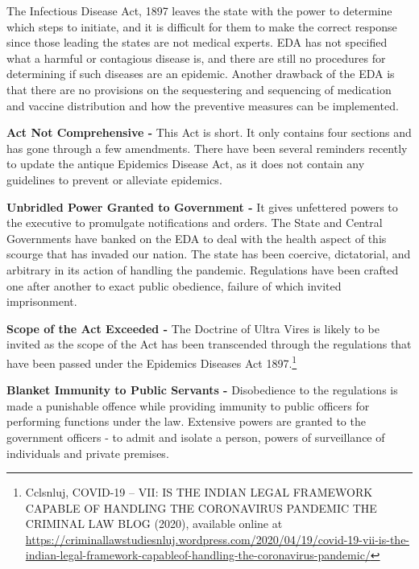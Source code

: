 \begin{multicols}{2}
\noi
The Infectious Disease Act, 1897 leaves the state with the power to determine which steps to
initiate, and it is difficult for them to make the correct response since those leading the states
are not medical experts. EDA has not specified what a harmful or contagious disease is, and
there are still no procedures for determining if such diseases are an epidemic. Another
drawback of the EDA is that there are no provisions on the sequestering and sequencing of
medication and vaccine distribution and how the preventive measures can be implemented.

\noi
\textbf{Act Not Comprehensive -} This Act is short. It only contains four sections and has gone
through a few amendments. There have been several reminders recently to update the antique
Epidemics Disease Act, as it does not contain any guidelines to prevent or alleviate
epidemics.

\vspace{-.1cm}

\noi
\textbf{Unbridled Power Granted to Government -} It gives unfettered powers to the executive to
promulgate notifications and orders. The State and Central Governments have banked on the
EDA to deal with the health aspect of this scourge that has invaded our nation. The state has
been coercive, dictatorial, and arbitrary in its action of handling the pandemic. Regulations
have been crafted one after another to exact public obedience, failure of which invited
imprisonment.

\vspace{-.1cm}

\noi
\textbf{Scope of the Act Exceeded -} The Doctrine of Ultra Vires is likely to be invited as the scope
of the Act has been transcended through the regulations that have been passed under the
Epidemics Diseases Act 1897.\footnote{Cclsnluj, COVID-19 – VII: IS THE INDIAN LEGAL FRAMEWORK CAPABLE OF HANDLING THE CORONAVIRUS PANDEMIC THE CRIMINAL LAW BLOG (2020), available online at\\ \url{https://criminallawstudiesnluj.wordpress.com/2020/04/19/covid-19-vii-is-the-indian-legal-framework-capableof-handling-the-coronavirus-pandemic/}}

\vspace{-.1cm}

\noi
\textbf{Blanket Immunity to Public Servants -} Disobedience to the regulations is made a
punishable offence while providing immunity to public officers for performing functions
under the law. Extensive powers are granted to the government officers - to admit and isolate
a person, powers of surveillance of individuals and private premises.


\end{multicols}
